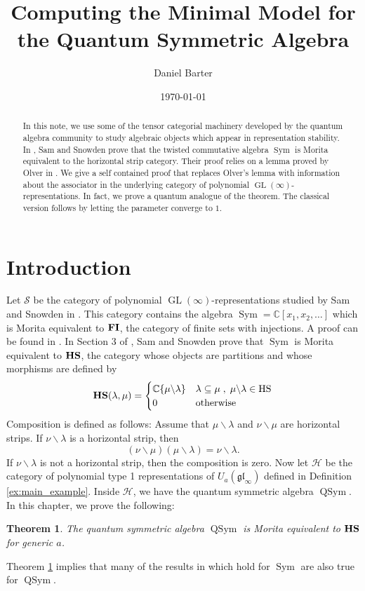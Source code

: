 \documentclass[12pt]{amsart}
\title{Computing the Minimal Model for the Quantum Symmetric Algebra}
\author{Daniel Barter}
\date{\today}
\theoremstyle{plain}
\newtheorem{Theorem}{Theorem}
\theoremstyle{definition}
\DeclareMathOperator{\Sym}{Sym}
\DeclareMathOperator{\QSym}{QSym}
\DeclareMathOperator{\GL}{GL}
\begin{document}
\begin{abstract}
In this note, we use some of the tensor categorial machinery developed by the quantum algebra community to study algebraic objects which appear in representation stability. In \cite{MR3430359}, Sam and Snowden prove that the twisted commutative algebra $\Sym$ is Morita equivalent to the horizontal strip category. Their proof relies on a lemma proved by Olver in \cite{MR924166}. We give a self contained proof that replaces Olver's lemma with information about the associator in the underlying category of polynomial $\GL(\infty)$-representations. In fact, we prove a quantum analogue of the theorem. The classical version follows by letting the parameter converge to $1$. 
\end{abstract}

\maketitle

\section{Introduction} \label{sec:introduction}

Let $\mathcal{S}$ be the category of polynomial $\GL(\infty)$-representations studied by Sam and Snowden in \cite{MR3430359}. This category contains the algebra $\Sym = \mathbb{C}[x_1,x_2,\dots]$ which is Morita equivalent to ${\bf FI}$, the category of finite sets with injections. A proof can be found in \cite{MR3556290}. In Section 3 of \cite{MR3430359}, Sam and Snowden prove that $\Sym$ is Morita equivalent to ${\bf HS}$, the category whose objects are partitions and whose morphisms are defined by
\[
{\bf HS}(\lambda,\mu) = \begin{cases}
\mathbb{C} \{ \mu \backslash \lambda \} & \lambda \subseteq \mu \; , \; \mu \backslash \lambda \in {\rm
HS}
\\
0 & \text{otherwise}
\end{cases}
\]
Composition is defined as follows: Assume that \( \mu \backslash \lambda \) and \( \nu \backslash \mu \) are horizontal strips. If \( \nu
\backslash \lambda \) is a horizontal strip, then
\[
(\nu \backslash \mu)(\mu \backslash \lambda) =  \nu \backslash \lambda.
\]
If \( \nu \backslash \lambda \) is not a horizontal strip, then the composition is zero. Now let $\mathcal{H}$ be the category of polynomial type 1 representations of $U_a(\mathfrak{gl}_{\infty})$ defined in Definition \ref{ex:main_example}. Inside $\mathcal{H}$, we have the quantum symmetric algebra $\QSym$. In this chapter, we prove the following:
\begin{Theorem} \label{thm:minimal_model}
The quantum symmetric algebra $\QSym$ is Morita equivalent to ${\bf HS}$ for generic $a$.
\end{Theorem}
\noindent Theorem \ref{thm:minimal_model} implies that many of the results in \cite{MR3430359} which hold for $\Sym$ are also true for $\QSym$. 
\end{document}
